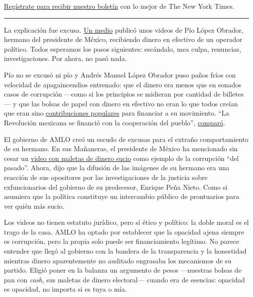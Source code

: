 \href{https://www.nytimes3xbfgragh.onion/newsletters/el-times}{Regístrate
para recibir nuestro boletín} con lo mejor de The New York Times.

\begin{center}\rule{0.5\linewidth}{\linethickness}\end{center}

La explicación fue excusa.
\href{https://latinus.us/2020/08/21/es-distinto-menos-dinero-aportaciones-amlo-video-pio-amlo-david-leon/}{Un
medio} publicó unos videos de Pío López Obrador, hermano del presidente
de México, recibiendo dinero en efectivo de un operador político. Todos
esperamos los pasos siguientes: escándalo, mea culpa, renuncias,
investigaciones. Por ahora, no pasó nada.

Pío no se excusó ni pío y Andrés Manuel López Obrador puso paños fríos
con velocidad de apagaincendios entrenado: que el dinero era menos que
en sonados casos de corrupción ---como si los principios se midieran por
cantidad de billetes--- y que las bolsas de papel con dinero en efectivo
no eran lo que todos creían que eran sino
\href{https://www.animalpolitico.com/2020/08/amlo-respuesta-video-pio-lopez-obrador-david-leon-dinero/}{contribuciones
populares} para financiar a su movimiento. ``La Revolución mexicana se
financió con la cooperación del pueblo'',
\href{https://twitter.com/Reforma/status/1296907427053334528}{comparó}.

El gobierno de AMLO creó un escudo de excusas para el extraño
comportamiento de su hermano. En sus Mañaneras, el presidente de México
ha mencionado sin cesar un
\href{https://www.nytimes3xbfgragh.onion/es/2020/08/21/espanol/opinion/emilio-lozoya-amlo.html}{video
con maletas de dinero sucio} como ejemplo de la corrupción ``del
pasado''. Ahora, dijo que la difusión de las imágenes de su hermano era
una reacción de sus opositores por las investigaciones de la justicia
sobre exfuncionarios del gobierno de su predecesor, Enrique Peña Nieto.
Como si asumiera que la política constituye un intercambio público de
prontuarios para ver quién más sucio.

Los videos no tienen estatuto jurídico, pero sí ético y político: la
doble moral es el trago de la casa. AMLO ha optado por establecer que la
opacidad ajena siempre es corrupción, pero la propia solo puede ser
financiamiento legítimo. No parece entender que llegó al gobierno con la
bandera de la transparencia y la honestidad mientras dinero
aparentemente no auditado engrasaba los mecanismos de su partido. Eligió
poner en la balanza un argumento de pesos ---nuestras bolsas de pan con
\emph{cash}, sus maletas de dinero electoral--- cuando era de esencias:
opacidad es opacidad, no importa si es tuya o mía.

